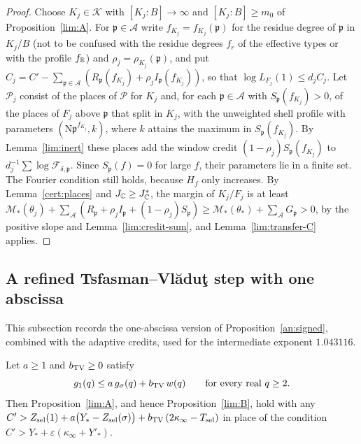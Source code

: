 \begin{proof}
Choose $K_j\in\mathcal K$ with $[K_j:B]\to\infty$ and $[K_j:B]\ge m_0$ of
Proposition~\ref{lim:A}. For $\mathfrak p\in\mathcal A$ write
$f_{K_j}=f_{K_j}(\mathfrak p)$ for the residue degree of $\mathfrak p$ in
$K_j/B$ (not to be confused with the residue degrees $f_r$ of the effective
types or with the profile $f_\mathbb R$) and $\rho_j=\rho_{K_j}(\mathfrak p)$, and
put $C_j=C'-\sum_{\mathfrak p\in\mathcal
A}(R_{\mathfrak p}(f_{K_j})+\rho_jI_{\mathfrak p}(f_{K_j}))$, so that $\log
L_{F_j}(1)\le d_jC_j$. Let $\mathcal P_j$ consist of the places of
$\mathcal P$ for $K_j$ and, for each $\mathfrak p\in\mathcal A$ with
$S_{\mathfrak p}(f_{K_j})>0$, of the places of $F_j$ above $\mathfrak p$ that
split in $K_j$, with the unweighted shell profile with parameters
$(\mathrm N\mathfrak p^{f_{K_j}},k)$, where $k$ attains the maximum in
$S_{\mathfrak p}(f_{K_j})$. By Lemma~\ref{lim:inert} these places add the window
credit $(1-\rho_j)S_{\mathfrak p}(f_{K_j})$ to
$d_j^{-1}\sum\log\mathcal F_{\delta,\mathfrak p}$. Since
$S_{\mathfrak p}(f)=0$ for large $f$, their parameters lie in a finite set. The
Fourier condition still holds, because $H_f$ only increases. By
Lemma~\ref{cert:places} and $J_\mathbb C\ge J_\mathbb C^*$, the margin of $K_j/F_j$ is at
least $\mathcal M_*(\theta_j)+\sum_{\mathcal A}(R_{\mathfrak p}+\rho_j
I_{\mathfrak p}+(1-\rho_j)S_{\mathfrak p})\ge\mathcal M_*(\theta_*)+\sum_{\mathcal A}
G_{\mathfrak p}>0$, by the positive slope and Lemma~\ref{lim:credit-sum}, and
Lemma~\ref{lim:transfer-C} applies.
\end{proof}

\subsection{A refined Tsfasman--Vl\u{a}du\c{t} step with one abscissa}

This subsection records the one-abscissa version of
Proposition~\ref{an:signed}, combined with the adaptive credits, used for the
intermediate exponent $1.043116$.

\begin{proposition}\label{lim:D}
Let $a\ge1$ and $b_{\rm TV}\ge0$ satisfy
\begin{equation}\label{lim:kernel}
 g_1(q)\le a\,g_\sigma(q)+b_{\rm TV}\,w(q)\qquad\text{for every real }q\ge2.
\end{equation}
Then Proposition~\ref{lim:A}, and hence Proposition~\ref{lim:B}, hold with any
$C'>Z_{\rm sel}(1)+a\bigl(Y_*-Z_{\rm sel}(\sigma)\bigr)+b_{\rm TV}\,(2\kappa_\infty-T_{\rm sel})$
in place of the condition $C'>Y_*+\varepsilon(\kappa_\infty+Y'_*)$.
\end{proposition}

